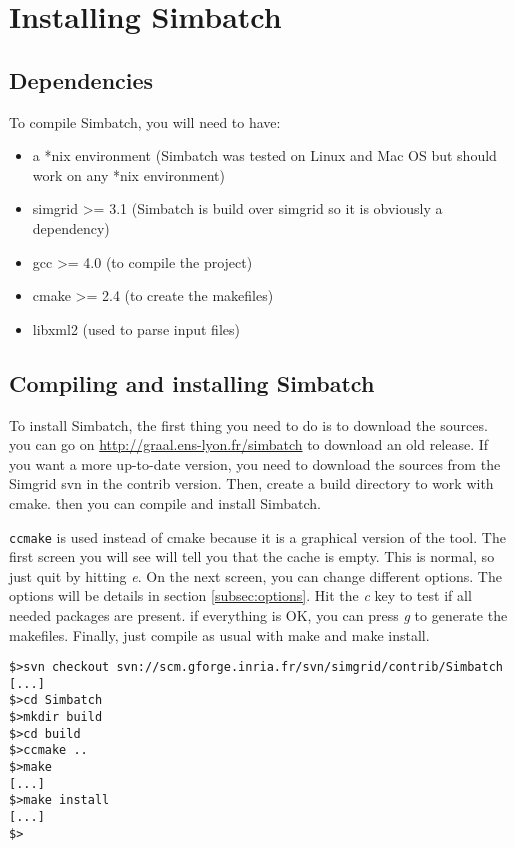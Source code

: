 \section{Installing Simbatch}
\label{sec:installation}

\subsection{Dependencies}
\label{subsec:dependencies}

To compile Simbatch, you will need to have:

\begin{itemize}
  \item a *nix environment (Simbatch was tested on Linux and Mac OS
    but should work on any *nix environment)
  \item simgrid >= 3.1 (Simbatch is build over simgrid so it is
    obviously a dependency)
  \item gcc >= 4.0 (to compile the project)
  \item cmake >= 2.4 (to create the makefiles)
  \item libxml2 (used to parse input files)
\end{itemize}

\subsection{Compiling and installing Simbatch}
\label{subsec:compilation}

To install Simbatch, the first thing you need to do is to download the
sources. you can go on \url{http://graal.ens-lyon.fr/simbatch} to
download an old release. If you want a more up-to-date version, you
need to download the sources from the Simgrid svn in the contrib
version. Then, create a build directory to work with cmake. then you
can compile and install Simbatch.

\verb+ccmake+ is used instead of cmake because it is a graphical
version of the tool. The first screen you will see will tell you that
the cache is empty. This is normal, so just quit by hitting \emph{e}.
On the next screen, you can change different options. The options will
be details in section \ref{subsec:options}. Hit the \emph{c} key to
test if all needed packages are present. if everything is OK, you can
press \emph{g} to generate the makefiles. Finally, just compile as
usual with make and make install.

{\small
\begin{verbatim}
$>svn checkout svn://scm.gforge.inria.fr/svn/simgrid/contrib/Simbatch
[...]
$>cd Simbatch
$>mkdir build
$>cd build
$>ccmake ..
$>make
[...]
$>make install
[...]
$>
\end{verbatim}}

